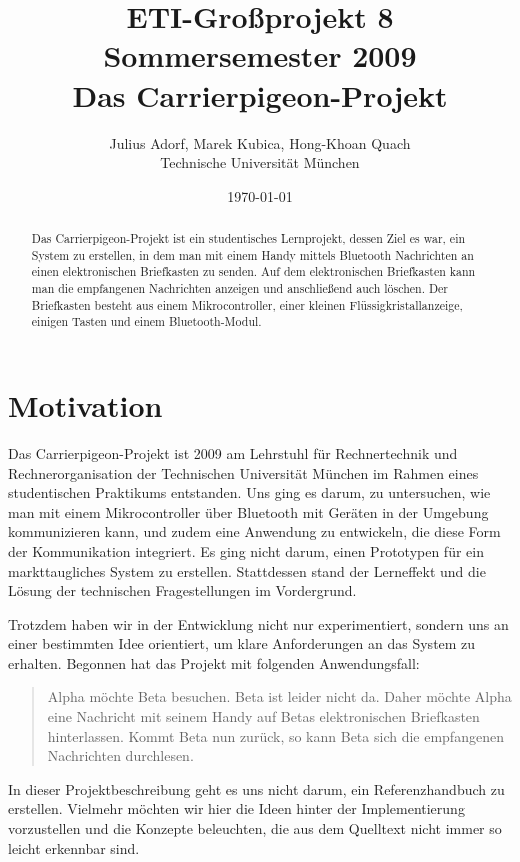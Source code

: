 \documentclass[ngerman]{article}
\author{Julius Adorf, Marek Kubica, Hong-Khoan Quach\\Technische Universität München}
\title{ETI-Großprojekt 8\\
       Sommersemester 2009\\
       {\bf Das Carrierpigeon-Projekt}
}
\date{\today}
\begin{document}
\maketitle

\begin{abstract}

Das Carrierpigeon-Projekt ist ein studentisches Lernprojekt, dessen Ziel es
war, ein System zu erstellen, in dem man mit einem Handy mittels Bluetooth
Nachrichten an einen elektronischen Briefkasten zu senden. Auf dem
elektronischen Briefkasten kann man die empfangenen Nachrichten anzeigen und
anschließend auch löschen. Der Briefkasten besteht aus einem Mikrocontroller,
einer kleinen Flüssig\-kristall\-an\-zeige, einigen Tasten und einem
Bluetooth-Modul.

\end{abstract}

\section{Motivation}

Das Carrierpigeon-Projekt ist 2009 am Lehrstuhl für Rechnertechnik und
Rechnerorganisation der Technischen Universität München im Rahmen eines
studentischen Praktikums entstanden. Uns ging es darum, zu untersuchen, wie man
mit einem Mikrocontroller über Bluetooth mit Geräten in der Umgebung
kommunizieren kann, und zudem eine Anwendung zu entwickeln, die diese Form der
Kommunikation integriert. Es ging nicht darum, einen Prototypen für ein
markttaugliches System zu erstellen. Stattdessen stand der Lerneffekt und die
Lösung der technischen Fragestellungen im Vordergrund.

Trotzdem haben wir in der Entwicklung nicht nur experimentiert, sondern uns an
einer bestimmten Idee orientiert, um klare Anforderungen an das System zu
erhalten. Begonnen hat das Projekt mit folgenden Anwendungsfall:

\begin{quote}

Alpha möchte Beta besuchen. Beta ist leider nicht da. Daher möchte Alpha eine
Nachricht mit seinem Handy auf Betas elektronischen Briefkasten hinterlassen.
Kommt Beta nun zurück, so kann Beta sich die empfangenen Nachrichten
durchlesen.

\end{quote}

In dieser Projektbeschreibung geht es uns nicht darum, ein Referenzhandbuch zu
erstellen. Vielmehr möchten wir hier die Ideen hinter der Implementierung
vorzustellen und die Konzepte beleuchten, die aus dem Quelltext nicht immer so
leicht erkennbar sind.
\end{document}
